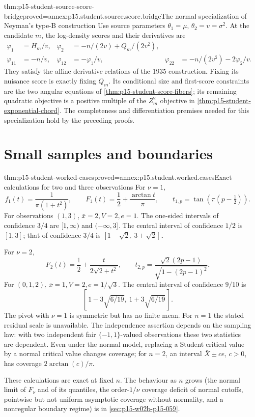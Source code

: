 \begin{hblemma}{thm:p15-student-source-score-bridge}{proved=annex:p15.student.source.score.bridge}{The normal specialization of Neyman's type-B construction}
Use source parameters \(\theta_1=\mu\), \(\theta_2=v=\sigma^2\).
At the candidate \(m\), the log-density scores and their
derivatives are
\[
\begin{aligned}
 \varphi_1&=H_m/v,&
 \varphi_2&=-n/(2v)+Q_m/(2v^2),\\
 \varphi_{11}&=-n/v,&
 \varphi_{12}&=-\varphi_1/v,&
 \varphi_{22}&=-n/(2v^2)-2\varphi_2/v.
\end{aligned}
\]
They satisfy the affine derivative relations of the 1935
construction. Fixing its nuisance score is exactly fixing
\(Q_m\). Its conditional size and first-score constraints
are the two angular equations of
\cref{thm:p15-student-score-fibers}; its remaining quadratic
objective is a positive multiple of the \(Z_m^2\) objective
in \cref{thm:p15-student-exponential-chord}.
The completeness and differentiation premises needed for this
specialization hold by the preceding proofs.
\end{hblemma}

\section{Small samples and boundaries}

\begin{hbtheorem}{thm:p15-student-worked-cases}{proved=annex:p15.student.worked.cases}{Exact calculations for two and three observations}
For \(\nu=1\),
\[
 f_1(t)=\frac1{\pi(1+t^2)},\qquad
 F_1(t)=\frac12+\frac{\arctan t}{\pi},\qquad
 t_{1,p}=\tan\!\left(\pi(p-\tfrac12)\right).
\]
For observations \((1,3)\), \(\bar x=2,V=2,e=1\).
The one-sided intervals of confidence \(3/4\) are
\([1,\infty)\) and \((-\infty,3]\).
The central interval of confidence \(1/2\) is \([1,3]\);
that of confidence \(3/4\) is
\([1-\sqrt2,\,3+\sqrt2]\).

For \(\nu=2\),
\[
 F_2(t)=\frac12+\frac{t}{2\sqrt{2+t^2}},\qquad
 t_{2,p}=\frac{\sqrt2(2p-1)}{\sqrt{1-(2p-1)^2}}.
\]
For \((0,1,2)\), \(\bar x=1,V=2,e=1/\sqrt3\).
The central interval of confidence \(9/10\) is
\[
                   [\,1-3\sqrt{6/19},\ 1+3\sqrt{6/19}\,].
\]
The pivot with \(\nu=1\) is symmetric but has no finite mean.
For \(n=1\) the stated residual scale is unavailable.
The independence assertion depends on the sampling law:
with two independent fair
\(\{-1,1\}\)-valued observations these two statistics are
dependent. Even under the normal model, replacing a Student
critical value by a normal critical value changes coverage;
for \(n=2\), an interval \(\bar X\pm c e\), \(c>0\), has
coverage \(2\arctan(c)/\pi\).
\end{hbtheorem}

These calculations are exact at fixed \(n\). The behaviour as \(n\) grows (the normal limit of \(F_\nu\) and of its quantiles, the order-\(1/\nu\) coverage deficit of normal cutoffs, pointwise but not uniform asymptotic coverage without normality, and a nonregular boundary regime) is in \cref{sec:p15-w02b-p15-059}.
